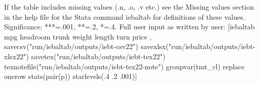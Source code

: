 If the table includes missing values (.n, .o, .v etc.) see the Missing values section in the help file for the Stata command iebaltab for definitions of these values. Significance: ***=.001, **=.2, *=.4. Full user input as written by user: [iebaltab mpg headroom trunk weight length turn price , savecsv("run/iebaltab/outputs/iebt-csv22") savexlsx("run/iebaltab/outputs/iebt-xlsx22") savetex("run/iebaltab/outputs/iebt-tex22") texnotefile("run/iebaltab/outputs/iebt-tex22-note") groupvar(tmt\_cl) replace onerow stats(pair(p)) starlevels(.4 .2 .001)] 
